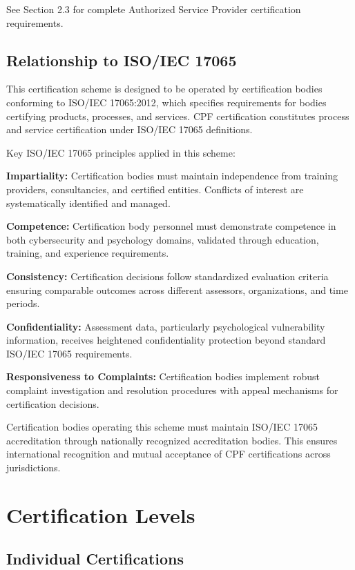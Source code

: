 \documentclass[11pt,a4paper]{article}
\begin{document}
See Section 2.3 for complete Authorized Service Provider certification requirements.

\subsection{Relationship to ISO/IEC 17065}

This certification scheme is designed to be operated by certification bodies conforming to ISO/IEC 17065:2012, which specifies requirements for bodies certifying products, processes, and services. CPF certification constitutes process and service certification under ISO/IEC 17065 definitions.

Key ISO/IEC 17065 principles applied in this scheme:

\textbf{Impartiality:} Certification bodies must maintain independence from training providers, consultancies, and certified entities. Conflicts of interest are systematically identified and managed.

\textbf{Competence:} Certification body personnel must demonstrate competence in both cybersecurity and psychology domains, validated through education, training, and experience requirements.

\textbf{Consistency:} Certification decisions follow standardized evaluation criteria ensuring comparable outcomes across different assessors, organizations, and time periods.

\textbf{Confidentiality:} Assessment data, particularly psychological vulnerability information, receives heightened confidentiality protection beyond standard ISO/IEC 17065 requirements.

\textbf{Responsiveness to Complaints:} Certification bodies implement robust complaint investigation and resolution procedures with appeal mechanisms for certification decisions.

Certification bodies operating this scheme must maintain ISO/IEC 17065 accreditation through nationally recognized accreditation bodies. This ensures international recognition and mutual acceptance of CPF certifications across jurisdictions.

\section{Certification Levels}

\subsection{Individual Certifications}
\end{document}
